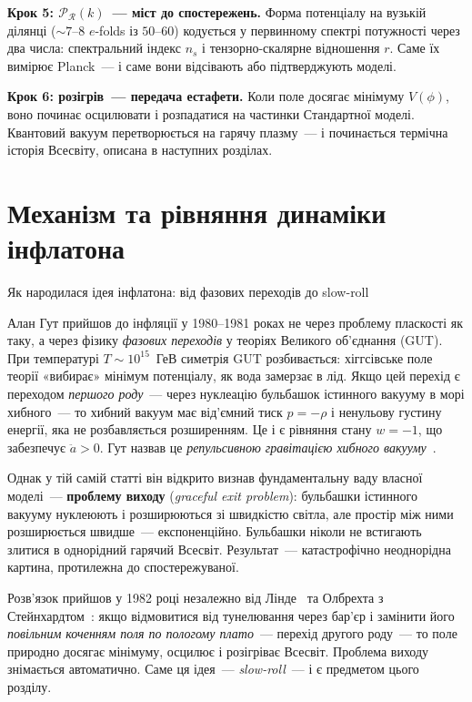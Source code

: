 \medskip
\noindent\textbf{Крок 5: $\mathcal{P}_{\mathcal{R}}(k)$~--- міст до спостережень.}
Форма потенціалу на вузькій ділянці ($\sim 7$--$8$ $e$-folds
із $50$--$60$) кодується у первинному спектрі потужності
через два числа: спектральний індекс $n_s$ і
тензорно-скалярне відношення $r$. Саме їх вимірює Planck~---
і саме вони відсівають або підтверджують моделі.

\medskip
\noindent\textbf{Крок 6: розігрів~--- передача естафети.}
Коли поле досягає мінімуму $V(\phi)$, воно починає
осцилювати і розпадатися на частинки Стандартної моделі.
Квантовий вакуум перетворюється на гарячу плазму~---
і починається термічна історія Всесвіту, описана в наступних
розділах.


\section{Механізм та рівняння динаміки інфлатона}
\label{subsec:inflaton_dynamics}


\begin{keybox}{Як народилася ідея інфлатона: від фазових переходів до slow-roll}

Алан Гут прийшов до інфляції у 1980--1981 роках не через проблему
пласкості як таку, а через фізику \emph{фазових переходів} у теоріях
Великого об'єднання (GUT). При температурі $T \sim 10^{15}$~ГеВ
симетрія GUT розбивається: хіггсівське поле теорії «вибирає» мінімум
потенціалу, як вода замерзає в лід. Якщо цей перехід є переходом
\emph{першого роду}~--- через нуклеацію бульбашок істинного вакууму
в морі хибного~--- то хибний вакуум має від'ємний тиск $p = -\rho$
і ненульову густину енергії, яка не розбавляється розширенням.
Це і є рівняння стану $w = -1$, що забезпечує $\ddot{a} > 0$.
Гут назвав це \emph{репульсивною гравітацією хибного вакууму}~\cite{guth_1981}.

Однак у тій самій статті він відкрито визнав фундаментальну ваду
власної моделі~--- \textbf{проблему виходу} (\emph{graceful exit
problem}): бульбашки істинного вакууму нуклеюють і розширюються
зі швидкістю світла, але простір між ними розширюється швидше~---
експоненційно. Бульбашки ніколи не встигають злитися в однорідний
гарячий Всесвіт. Результат~--- катастрофічно неоднорідна картина,
протилежна до спостережуваної.

Розв'язок прийшов у 1982 році незалежно від Лінде~\cite{linde_1982}
та Олбрехта з Стейнхардтом~\cite{albrecht_1982}: якщо відмовитися
від тунелювання через бар'єр і замінити його \emph{повільним
коченням поля по пологому плато}~--- перехід другого роду~--- то
поле природно досягає мінімуму, осцилює і розігріває Всесвіт.
Проблема виходу знімається автоматично.
Саме ця ідея~--- \emph{slow-roll}~--- і є предметом цього розділу.
\end{keybox}

